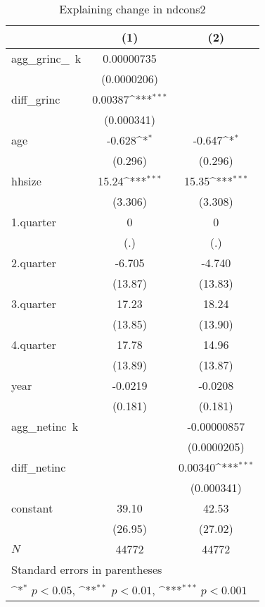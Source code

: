 \begin{table}[htbp]\centering
\def\sym#1{\ifmmode^{#1}\else\(^{#1}\)\fi}
\caption{\label{ndcons2\_deltainc} Explaining change in ndcons2}
\begin{tabular}{l*{2}{c}}
\hline\hline
            &\multicolumn{1}{c}{(1)}         &\multicolumn{1}{c}{(2)}         \\
\hline
agg\_grinc\_~k&  0.00000735         &                     \\
            & (0.0000206)         &                     \\
diff\_grinc  &     0.00387\sym{***}&                     \\
            &  (0.000341)         &                     \\
age         &      -0.628\sym{*}  &      -0.647\sym{*}  \\
            &     (0.296)         &     (0.296)         \\
hhsize      &       15.24\sym{***}&       15.35\sym{***}\\
            &     (3.306)         &     (3.308)         \\
1.quarter   &           0         &           0         \\
            &         (.)         &         (.)         \\
2.quarter   &      -6.705         &      -4.740         \\
            &     (13.87)         &     (13.83)         \\
3.quarter   &       17.23         &       18.24         \\
            &     (13.85)         &     (13.90)         \\
4.quarter   &       17.78         &       14.96         \\
            &     (13.89)         &     (13.87)         \\
year        &     -0.0219         &     -0.0208         \\
            &     (0.181)         &     (0.181)         \\
agg\_netinc~k&                     & -0.00000857         \\
            &                     & (0.0000205)         \\
diff\_netinc &                     &     0.00340\sym{***}\\
            &                     &  (0.000341)         \\
constant    &       39.10         &       42.53         \\
            &     (26.95)         &     (27.02)         \\
\hline
\(N\)       &       44772         &       44772         \\
\hline\hline
\multicolumn{3}{l}{\footnotesize Standard errors in parentheses}\\
\multicolumn{3}{l}{\footnotesize \sym{*} \(p<0.05\), \sym{**} \(p<0.01\), \sym{***} \(p<0.001\)}\\
\end{tabular}
\end{table}
